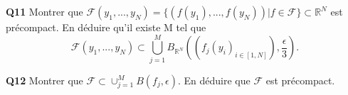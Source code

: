 \documentclass[french]{article}
\begin{document}
	\begin{tcolorbox}[colback=gray!5!white,colframe=gray!75!black]
		\textbf{\large{Q11}} Montrer que $\mathcal{F}(y_1,...,y_N) = \{(f(y_1),...,f(y_N)) | f \in \mathcal{F}\} \subset \mathbb{R}^N$ est précompact. En déduire qu'il existe M tel que
		\[\mathcal{F}(y_1,...,y_N) \subset \bigcup_{j=1}^{M}B_{\mathbb{R}^N}\left((f_j(y_i)_{i\in[1,N]}), \frac{\epsilon}{3}\right).\]
	\end{tcolorbox}

	\begin{tcolorbox}[colback=gray!5!white,colframe=gray!75!black]
		\textbf{\large{Q12}} Montrer que $\mathcal{F} \subset \cup_{j=1}^{M} B(f_j, \epsilon)$. En déduire que $\mathcal{F}$ est précompact.
	\end{tcolorbox}
	
\end{document}
